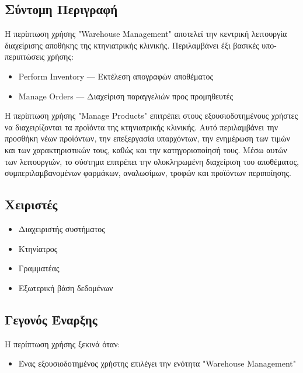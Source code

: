 \documentclass[12pt,a4paper,twoside]{book}
\begin{document}
\subsection{Σύντομη Περιγραφή}
Η περίπτωση χρήσης "Warehouse Management" αποτελεί την κεντρική λειτουργία διαχείρισης αποθήκης της κτηνιατρικής κλινικής. Περιλαμβάνει έξι βασικές υπο-περιπτώσεις χρήσης: %
\begin{itemize}
  \item Perform Inventory --- Εκτέλεση απογραφών αποθέματος
  \item Manage Orders --- Διαχείριση παραγγελιών προς προμηθευτές
\end{itemize}
Η περίπτωση χρήσης "Manage Products" επιτρέπει στους εξουσιοδοτημένους χρήστες να διαχειρίζονται τα προϊόντα της κτηνιατρικής κλινικής. Αυτό περιλαμβάνει την προσθήκη νέων προϊόντων, την επεξεργασία υπαρχόντων, την ενημέρωση των τιμών και των χαρακτηριστικών τους, καθώς και την κατηγοριοποίησή τους. Μέσω αυτών των λειτουργιών, το σύστημα επιτρέπει την ολοκληρωμένη διαχείριση του αποθέματος, συμπεριλαμβανομένων φαρμάκων, αναλωσίμων, τροφών και προϊόντων περιποίησης. %

\subsection{Χειριστές}
\begin{itemize}
  \item Διαχειριστής συστήματος
  \item Κτηνίατρος
  \item Γραμματέας
  \item Εξωτερική βάση δεδομένων %
\end{itemize}

\subsection{Γεγονός Έναρξης}
Η περίπτωση χρήσης ξεκινά όταν:
\begin{itemize}
  \item Ένας εξουσιοδοτημένος χρήστης επιλέγει την ενότητα "Warehouse Management" %
\end{itemize}
\end{document}
